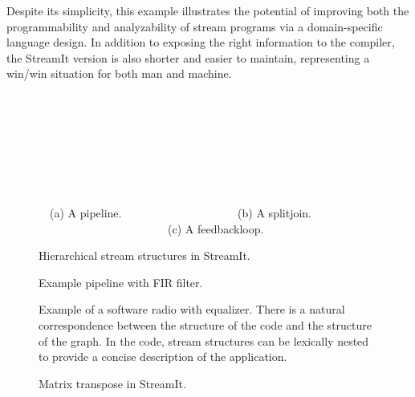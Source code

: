 Despite its simplicity, this example illustrates the potential of
improving both the programmability and analyzability of stream
programs via a domain-specific language design.  In addition to
exposing the right information to the compiler, the StreamIt version
is also shorter and easier to maintain, representing a win/win
situation for both man and machine.

\begin{figure}[t]
\centering
\begin{minipage}{0.598in}
{\centering
{} \\
}
\end{minipage} 
\hspace{0.45in}
\begin{minipage}{1.69in}
{\centering
{} \\
}
\end{minipage}
\hspace{0.45in}
\begin{minipage}{1.326in}
{\centering
{} \\
}
\end{minipage}
\\ ~ \\ {\mbox{~}\protect\small \mbox{~}(a) A pipeline. ~~~~~~~~~~~~~~~~~~~~(b) A splitjoin. ~~~~~~~~~~~~~~~~~~~~~~~(c) A feedbackloop.~~~~~~~~}
\caption{Hierarchical stream structures in StreamIt.\protect\label{fig:structures}}
\end{figure}

\begin{figure}[t]
\centering
{}
\hspace{0.15in}
\caption{Example pipeline with FIR filter.\protect\label{fig:pipeline}}
\end{figure}

\begin{figure}[t]
\centering
{}
\caption[Example of a software radio with equalizer]{Example of a
  software radio with equalizer.  There is a natural correspondence
  between the structure of the code and the structure of the graph.
  In the code, stream structures can be lexically nested to provide a
  concise description of the application.\protect\label{fig:fm-radio}}
\end{figure}

\begin{figure}[t]
\centering
{}
\caption{Matrix transpose in StreamIt.\protect\label{fig:transpose}}
\end{figure}

